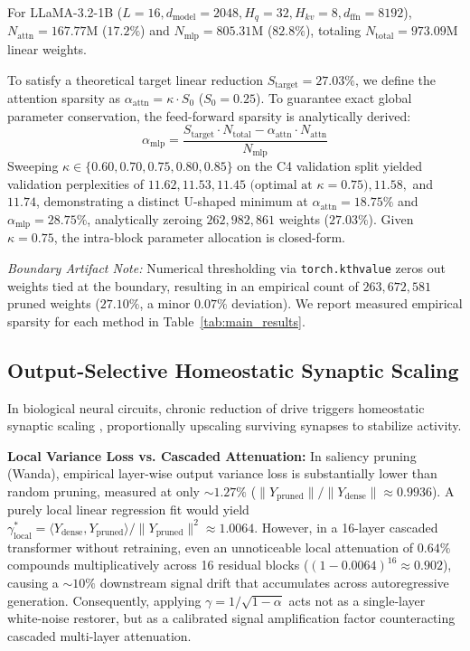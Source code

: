 \documentclass{article}
\begin{document}
For LLaMA-3.2-1B ($L=16, d_{\text{model}}=2048, H_q=32, H_{kv}=8, d_{\text{ffn}}=8192$), $N_{\text{attn}} = 167.77\text{M}$ ($17.2\%$) and $N_{\text{mlp}} = 805.31\text{M}$ ($82.8\%$), totaling $N_{\text{total}} = 973.09\text{M}$ linear weights.

To satisfy a theoretical target linear reduction $S_{\text{target}} = 27.03\%$, we define the attention sparsity as $\alpha_{\text{attn}} = \kappa \cdot S_0$ ($S_0 = 0.25$). To guarantee exact global parameter conservation, the feed-forward sparsity is analytically derived:
\begin{equation}
\alpha_{\text{mlp}} = \frac{S_{\text{target}} \cdot N_{\text{total}} - \alpha_{\text{attn}} \cdot N_{\text{attn}}}{N_{\text{mlp}}}
\end{equation}
Sweeping $\kappa \in \{0.60, 0.70, 0.75, 0.80, 0.85\}$ on the C4 validation split yielded validation perplexities of $11.62, 11.53, \mathbf{11.45}\text{ (optimal at }\kappa = 0.75\text{)}, 11.58,$ and $11.74$, demonstrating a distinct U-shaped minimum at $\alpha_{\text{attn}} = 18.75\%$ and $\alpha_{\text{mlp}} = 28.75\%$, analytically zeroing $262,982,861$ weights ($27.03\%$). Given $\kappa = 0.75$, the intra-block parameter allocation is closed-form.

\textit{Boundary Artifact Note:} Numerical thresholding via \texttt{torch.kthvalue} zeros out weights tied at the boundary, resulting in an empirical count of $263,672,581$ pruned weights ($27.10\%$, a minor $0.07\%$ deviation). We report measured empirical sparsity for each method in Table~\ref{tab:main_results}.

\subsection{Output-Selective Homeostatic Synaptic Scaling}
\label{sec:scaling_analysis}
In biological neural circuits, chronic reduction of drive triggers homeostatic synaptic scaling \cite{turrigiano2008self}, proportionally upscaling surviving synapses to stabilize activity.

\textbf{Local Variance Loss vs. Cascaded Attenuation:} In saliency pruning (Wanda), empirical layer-wise output variance loss is substantially lower than random pruning, measured at only $\sim 1.27\%$ ($\|Y_{\text{pruned}}\|/\|Y_{\text{dense}}\| \approx 0.9936$). A purely local linear regression fit would yield $\gamma_{\text{local}}^* = \langle Y_{\text{dense}}, Y_{\text{pruned}} \rangle / \|Y_{\text{pruned}}\|^2 \approx 1.0064$. However, in a 16-layer cascaded transformer without retraining, even an unnoticeable local attenuation of $0.64\%$ compounds multiplicatively across 16 residual blocks ($(1 - 0.0064)^{16} \approx 0.902$), causing a $\sim 10\%$ downstream signal drift that accumulates across autoregressive generation. Consequently, applying $\gamma = 1/\sqrt{1 - \alpha}$ acts not as a single-layer white-noise restorer, but as a calibrated signal amplification factor counteracting cascaded multi-layer attenuation.
\end{document}
